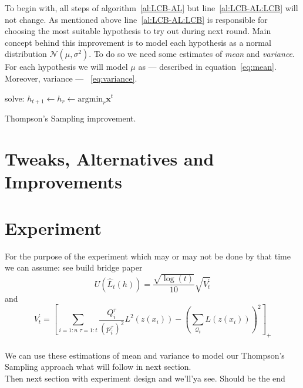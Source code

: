 \documentclass[12pt, a4paper, pdflatex]{report}
\begin{document}
To begin with, all steps of algorithm~\ref{al:LCB-AL} but line~\ref{al:LCB-AL:LCB} will not change. As mentioned above line~\ref{al:LCB-AL:LCB} is responsible for choosing the most suitable hypothesis to try out during next round. Main concept behind this improvement is to model each hypothesis as a normal distribution $\mathcal{N}\left( \mu, \sigma^2 \right)$. To do so we need some estimates of \emph{mean} and \emph{variance}. For each hypothesis we will model $\mu$ as --- described in equation~\ref{eq:mean}. Moreover, variance --- ~\ref{eq:variance}.\\


\vspace{2cm}
\begin{algorithm}[H]
  solve: $h_{t+1} \leftarrow h_r \leftarrow \text{argmin}_{r} \mathbf{x}^t$\;
 \caption{Thompson's Sampling improvement.\label{al:TS-AL}}
\end{algorithm}
\vspace{2cm}


\section{Tweaks, Alternatives and Improvements\label{sec:qimprove}}

\lipsum[1]

\section{Experiment}

For the purpose of the experiment which may or may not be done by that time we can assume: see build bridge paper
$$
U(\hat{L}_t(h)) = \frac{ \sqrt{ \log(t) } }
                       { 10 }
                  \sqrt{ V^\prime_t }
$$
and
$$
V^\prime_t = \left[
  \sum_{i = 1:n \text{~} \tau = 1:t} \frac{Q^\tau_i}{(p^\tau_i)^2} L^2(z(x_i))
  -
  \left( \sum_{\mathscr{Q}_t} L(z(x_i)) \right)^2
\right]_+
$$~\\


We can use these estimations of mean and variance to model our Thompson's Sampling approach what will follow in next section.\\

Then next section with experiment design and we'll'ya see. Should be the end \\
\end{document}
